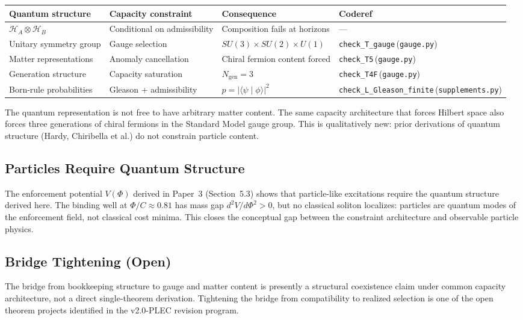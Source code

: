 \documentclass[11pt]{article}
\newcommand{\coderef}[2]{\texttt{#1}\,(\texttt{#2})}
\begin{document}
\begin{center}
\begin{tabular}{@{}llll@{}}
\toprule
Quantum structure & Capacity constraint & Consequence & Coderef \\
\midrule
$\mathcal{H}_A \otimes \mathcal{H}_B$ & Conditional on admissibility & Composition fails at horizons & --- \\
Unitary symmetry group & Gauge selection & $SU(3)\!\times\!SU(2)\!\times\!U(1)$ & \coderef{check\_T\_gauge}{gauge.py} \\
Matter representations & Anomaly cancellation & Chiral fermion content forced & \coderef{check\_T5}{gauge.py} \\
Generation structure & Capacity saturation & $N_{\mathrm{gen}} = 3$ & \coderef{check\_T4F}{gauge.py} \\
Born-rule probabilities & Gleason + admissibility & $p = \lvert\langle\psi\mid\phi\rangle\rvert^2$ & \coderef{check\_L\_Gleason\_finite}{supplements.py} \\
\bottomrule
\end{tabular}
\end{center}

The quantum representation is not free to have arbitrary matter content. The same
capacity architecture that forces Hilbert space also forces three generations of
chiral fermions in the Standard Model gauge group. This is qualitatively new:
prior derivations of quantum structure (Hardy, Chiribella et al.) do not constrain
particle content.

\subsection{Particles Require Quantum Structure}
The enforcement potential $V(\Phi)$ derived in Paper~3 (Section~5.3) shows that
particle-like excitations require the quantum structure derived here. The binding
well at $\Phi/C \approx 0.81$ has mass gap $d^2 V/d\Phi^2 > 0$, but no classical
soliton localizes: particles are quantum modes of the enforcement field, not
classical cost minima. This closes the conceptual gap between the constraint
architecture and observable particle physics.

\subsection{Bridge Tightening (Open)}
The bridge from bookkeeping structure to gauge and matter content is presently a
structural coexistence claim under common capacity architecture, not a direct
single-theorem derivation. Tightening the bridge from compatibility to realized
selection is one of the open theorem projects identified in the v2.0-PLEC
revision program.
\end{document}
